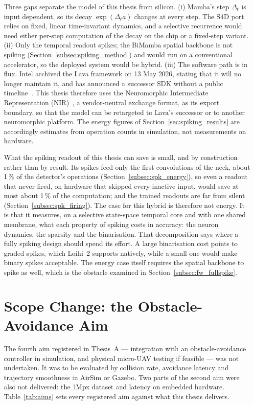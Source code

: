 \documentclass[11pt, a4paper]{report}
\begin{document}
Three gaps separate the model of this thesis from silicon. (i) Mamba's step $\Delta_t$ is input
dependent, so its decay $\exp(\Delta_t a)$ changes at every step. The S4D port relies on fixed, linear
time-invariant dynamics, and a selective recurrence would need either per-step computation of the decay
on the chip or a fixed-step variant. (ii) Only the temporal readout spikes; the BiMamba spatial backbone
is not spiking (Section~\ref{subsec:spiking_method}) and would run on a conventional accelerator, so the
deployed system would be hybrid. (iii) The software path is in flux. Intel archived the Lava framework on
13 May 2026, stating that it will no longer maintain it, and has announced a successor SDK without a
public timeline~\cite{intel2026lava}. This thesis therefore uses the Neuromorphic Intermediate
Representation (NIR)~\cite{pedersen2024neuromorphic}, a vendor-neutral exchange format, as its export
boundary, so that the model can be retargeted to Lava's successor or to another neuromorphic platform.
The energy figures of Section~\ref{sec:spiking_results} are accordingly estimates from operation counts
in simulation, not measurements on hardware.

What the spiking readout of this thesis can save is small, and by construction rather than by result. Its
spikes feed only the first convolutions of the neck, about 1\,\% of the detector's operations
(Section~\ref{subsec:spk_energy}), so even a readout that never fired, on hardware that skipped every
inactive input, would save at most about 1\,\% of the computation; and the trained readouts are far from
silent (Section~\ref{subsec:spk_firing}). The case for this hybrid is therefore not energy. It is that it
measures, on a selective state-space temporal core and with one shared membrane, what each property of
spiking costs in accuracy: the neuron dynamics, the sparsity and the binarisation. That decomposition says
where a fully spiking design should spend its effort. A large binarisation cost points to graded spikes,
which Loihi~2 supports natively, while a small one would make binary spikes acceptable. The energy case
itself requires the spatial backbone to spike as well, which is the obstacle examined in
Section~\ref{subsec:fw_fullspike}.

\section{Scope Change: the Obstacle-Avoidance Aim}
\label{sec:scope_change}
The fourth aim registered in Thesis~A --- integration with an obstacle-avoidance controller in
simulation, and physical micro-UAV testing if feasible --- was not undertaken. It was to be evaluated by
collision rate, avoidance latency and trajectory smoothness in AirSim or Gazebo. Two parts of the second
aim were also not delivered: the 1Mpx dataset and latency on embedded hardware. Table~\ref{tab:aims} sets
every registered aim against what this thesis delivers.
\end{document}
